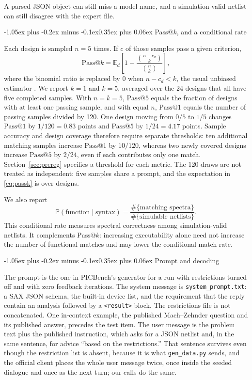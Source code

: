 \documentclass[11pt]{article}
\makeatletter
\renewcommand\subsection{\@startsection{subsection}{2}{\z@}%
  {-1.05ex plus -0.2ex minus -0.1ex}{0.35ex plus 0.06ex}%
  {\normalfont\normalsize\bfseries}}
\newcommand{\passk}[1]{\mathrm{Pass@}#1}
\makeatother
\begin{document}
A parsed JSON object can still miss a model name, and a simulation-valid netlist can still disagree with the expert file.

\subsection{\texorpdfstring{Pass@$k$, and a conditional rate}{Pass@k, and a conditional rate}}

Each design is sampled $n=5$ times.
If $c$ of those samples pass a given criterion,
\begin{equation}
\label{eq:passk}
\passk{k}
=
\mathbb{E}_{d}
\left[
1 - \frac{\binom{n-c_d}{k}}{\binom{n}{k}}
\right],
\end{equation}
where the binomial ratio is replaced by $0$ when $n-c_d < k$, the usual unbiased estimator \citep{chen2021codex}.
We report $k=1$ and $k=5$, averaged over the 24 designs that all have five completed samples.
With $n=k=5$, $\passk{5}$ equals the fraction of designs with at least one passing sample, and with equal $n$, $\passk{1}$ equals the number of passing samples divided by 120.
One design moving from $0/5$ to $1/5$ changes $\passk{1}$ by $1/120 = 0.83$ points and $\passk{5}$ by $1/24 = 4.17$ points.
Sample accuracy and design coverage therefore require separate thresholds: ten additional matching samples increase $\passk{1}$ by $10/120$, whereas two newly covered designs increase $\passk{5}$ by $2/24$, even if each contributes only one match. Section~\ref{sec:prereg} specifies a threshold for each metric.
The 120 draws are not treated as independent: five samples share a prompt, and the expectation in \eqref{eq:passk} is over designs.

We also report
\[
\mathbb{P}(\text{function}\mid\text{syntax})
=
\frac{\#\{\text{matching spectra}\}}{\#\{\text{simulable netlists}\}}.
\]
This conditional rate measures spectral correctness among simulation-valid netlists. It complements $\passk{k}$: increasing executability alone need not increase the number of functional matches and may lower the conditional match rate.

\subsection{Prompt and decoding}

The prompt is the one in PICBench's generator for a run with restrictions turned off and with zero feedback iterations.
The system message is \texttt{system\_prompt.txt}: a SAX JSON schema, the built-in device list, and the requirement that the reply contain an analysis followed by a \texttt{\textless result\textgreater} block.
The restrictions file is not concatenated.
One in-context example, the published Mach--Zehnder question and its published answer, precedes the test item.
The user message is the problem text plus the published instruction, which asks for a JSON netlist and, in the same sentence, for advice ``based on the restrictions.''
That sentence survives even though the restriction list is absent, because it is what \texttt{gen\_data.py} sends, and the official client places the whole user message twice, once inside the seeded dialogue and once as the next turn; our calls do the same.
\end{document}
